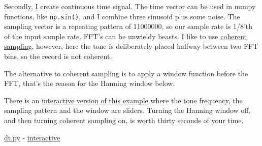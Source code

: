 Secondly, I create continuous time signal. The time vector can be used
in numpy functions, like \texttt{np.sin()}, and I combine three sinusoid
plus some noise. The sampling vector is a repeating pattern of 11000000,
so our sample rate is 1/8'th of the input sample rate. FFT's can be
unwieldy beasts. I like to use
\href{https://en.wikipedia.org/wiki/Talk\%3ACoherent_sampling}{coherent
sampling}, however, here the tone is deliberately placed halfway between
two FFT bins, so the record is not coherent.

The alternative to coherent sampling is to apply a window function
before the FFT, that's the reason for the Hanning window below.

There is an
\href{https://wulffern.github.io/aic2026/assets/examples/sampling.html}{interactive
version of this example} where the tone frequency, the sampling pattern
and the window are sliders. Turning the Hanning window off, and then
turning coherent sampling on, is worth thirty seconds of your time.

\href{https://github.com/wulffern/aic2026/blob/main/ex/dt.py}{dt.py} -
\href{https://wulffern.github.io/aic2026/assets/examples/sampling.html}{interactive}


